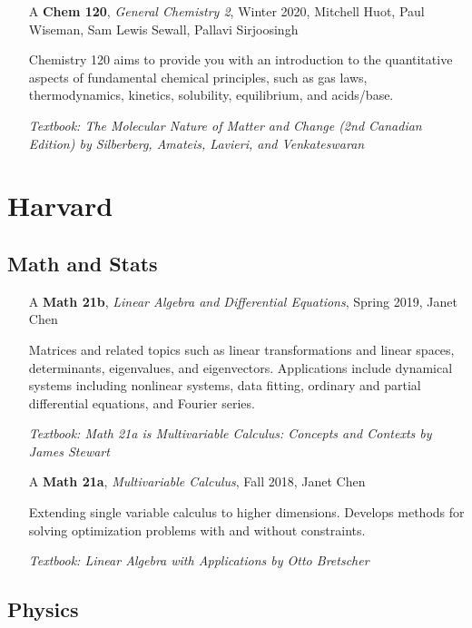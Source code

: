 \documentclass{scrartcl}
\begin{document}
\begin{itemize}
\item[A] \textbf{Chem 120}, \textit{General Chemistry 2}, Winter 2020, Mitchell
  Huot, Paul Wiseman, Sam Lewis Sewall, Pallavi Sirjoosingh
  
  Chemistry 120 aims to provide you with an introduction to the quantitative aspects of fundamental chemical principles, such as gas laws, thermodynamics, kinetics, solubility, equilibrium, and acids/base.
  
  \textit{\small Textbook: The Molecular Nature of Matter and Change (2nd
    Canadian Edition) by Silberberg, Amateis, Lavieri, and Venkateswaran}
\end{itemize}


\section*{Harvard}

\subsection*{Math and Stats}

\begin{itemize}
  \item[A] \textbf{Math 21b}, \textit{Linear Algebra and Differential Equations}, Spring 2019, Janet Chen 
  
  Matrices and related topics such as linear transformations and linear spaces, determinants, eigenvalues, and eigenvectors. Applications include dynamical systems including nonlinear systems, data fitting, ordinary and partial differential equations, and Fourier series.
  
  \textit{\small Textbook: Math 21a is Multivariable Calculus: Concepts and Contexts by James Stewart}
  
  \item[A] \textbf{Math 21a}, \textit{Multivariable Calculus}, Fall 2018, Janet Chen 
  
  Extending single variable calculus to higher dimensions. Develops methods for solving optimization problems with and without constraints.
  
  \textit{\small Textbook: Linear Algebra with Applications by Otto Bretscher}
  
\end{itemize} 

\subsection*{Physics}
\end{document}
